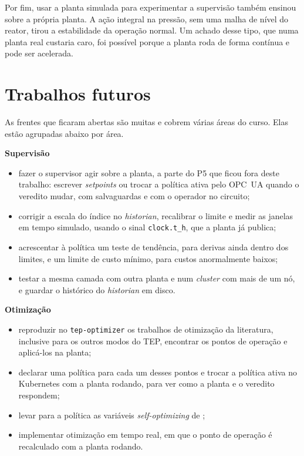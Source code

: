 Por fim, usar a planta simulada para experimentar a supervisão também ensinou sobre a própria planta. A ação integral na pressão, sem uma malha de nível do reator, tirou a estabilidade da operação normal. Um achado desse tipo, que numa planta real custaria caro, foi possível porque a planta roda de forma contínua e pode ser acelerada.

\section{Trabalhos futuros}
\label{sec:trabalhos_futuros}

As frentes que ficaram abertas são muitas e cobrem várias áreas do curso. Elas estão agrupadas abaixo por área.

\noindent\textbf{Supervisão}
\begin{itemize}
	\item fazer o supervisor agir sobre a planta, a parte do P5 que ficou fora deste trabalho: escrever \textit{setpoints} ou trocar a política ativa pelo OPC~UA quando o veredito mudar, com salvaguardas e com o operador no circuito;
	\item corrigir a escala do índice no \textit{historian}, recalibrar o limite e medir as janelas em tempo simulado, usando o sinal \texttt{clock.t\_h}, que a planta já publica;
	\item acrescentar à política um teste de tendência, para derivas ainda dentro dos limites, e um limite de custo mínimo, para custos anormalmente baixos;
	\item testar a mesma camada com outra planta e num \textit{cluster} com mais de um nó, e guardar o histórico do \textit{historian} em disco.
\end{itemize}

\noindent\textbf{Otimização}
\begin{itemize}
	\item reproduzir no \texttt{tep-optimizer} os trabalhos de otimização da literatura, inclusive para os outros modos do TEP, encontrar os pontos de operação e aplicá-los na planta;
	\item declarar uma política para cada um desses pontos e trocar a política ativa no Kubernetes com a planta rodando, para ver como a planta e o veredito respondem;
	\item levar para a política as variáveis \textit{self-optimizing} de ;
	\item implementar otimização em tempo real, em que o ponto de operação é recalculado com a planta rodando.
\end{itemize}

